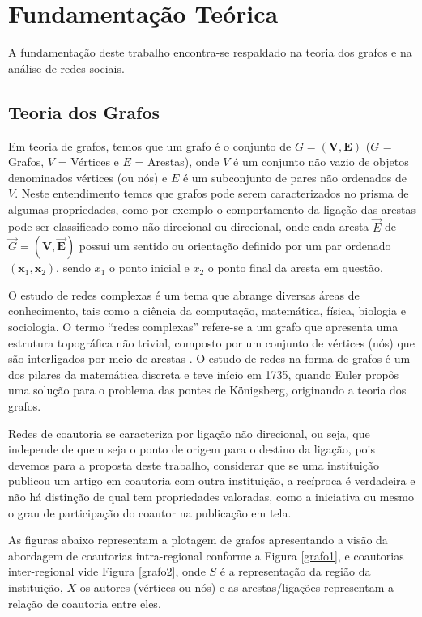 \documentclass[12pt]{article}
\begin{document}
\section{Fundamentação Teórica}

A fundamentação deste trabalho encontra-se respaldado na teoria dos grafos e na análise de redes sociais. 


\subsection{Teoria dos Grafos}

Em teoria de grafos, temos que um grafo é o conjunto de $G = (\bm V,\bm E)$ ($G$ = Grafos, $V$ = Vértices e $E$ = Arestas), onde $V$ é um conjunto não vazio de objetos denominados vértices (ou nós) e $E$ é um subconjunto de pares não ordenados de $V$. Neste entendimento temos que grafos pode serem caracterizados no prisma de algumas propriedades, como por exemplo o comportamento da ligação das arestas pode ser classificado como não direcional ou direcional, onde cada aresta $\Vec E$ de $\Vec G = (\bm V,\bm \Vec E)$ possui um sentido ou orientação definido por um par ordenado $(\bm x_{1}, \bm x_{2})$, sendo $x_{1}$ o ponto inicial e $x_{2}$ o ponto final da aresta em questão.

O estudo de redes complexas é um tema  que abrange diversas áreas de conhecimento, tais como a ciência da computação, matemática, física, biologia e sociologia. 
O termo ``redes complexas'' refere-se a um grafo que apresenta uma estrutura topográfica não trivial, composto por um conjunto de vértices (nós) que são interligados por meio de arestas \cite{barabasi2003everything}. 
O estudo de redes na forma de grafos é um dos pilares da matemática discreta e teve início em 1735, quando Euler propôs uma solução para o problema das pontes de Königsberg, originando a teoria dos grafos.

Redes de coautoria se caracteriza por ligação não direcional, ou seja, que independe de quem seja o ponto de origem para o destino da ligação, pois devemos para a proposta deste trabalho, considerar que se uma instituição publicou um artigo em coautoria com outra instituição, a recíproca é verdadeira e não há distinção de qual tem propriedades valoradas, como a iniciativa ou mesmo o grau de participação do coautor na publicação em tela.

As figuras abaixo representam a plotagem de grafos apresentando a visão da abordagem de coautorias intra-regional conforme a Figura \ref{grafo1}, e coautorias inter-regional vide Figura \ref{grafo2}, onde $S$ é a representação da região da instituição, $X$ os autores (vértices ou nós) e as arestas/ligações representam a relação de coautoria entre eles.
\end{document}

